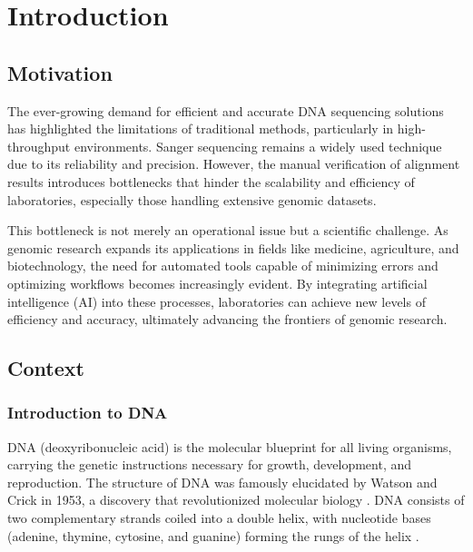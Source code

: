 
%

\chapter{Introduction}
\label{cha:Introduction}



\section{Motivation}
\label{sec:Motivation}

The ever-growing demand for efficient and accurate DNA sequencing solutions has highlighted the limitations of traditional methods, particularly in high-throughput environments. Sanger sequencing remains a widely used technique due to its reliability and precision. However, the manual verification of alignment results introduces bottlenecks that hinder the scalability and efficiency of laboratories, especially those handling extensive genomic datasets.

This bottleneck is not merely an operational issue but a scientific challenge. As genomic research expands its applications in fields like medicine, agriculture, and biotechnology, the need for automated tools capable of minimizing errors and optimizing workflows becomes increasingly evident. By integrating artificial intelligence (AI) into these processes, laboratories can achieve new levels of efficiency and accuracy, ultimately advancing the frontiers of genomic research.

\section{Context}
\label{sec:Context}

\subsection{Introduction to DNA}
DNA (deoxyribonucleic acid) is the molecular blueprint for all living organisms, carrying the genetic instructions necessary for growth, development, and reproduction. The structure of DNA was famously elucidated by Watson and Crick in 1953, a discovery that revolutionized molecular biology \cite{watson_crick_dna}. DNA consists of two complementary strands coiled into a double helix, with nucleotide bases (adenine, thymine, cytosine, and guanine) forming the rungs of the helix \cite{khan_dna_structure}.


